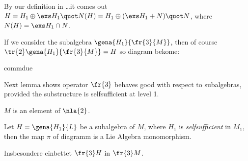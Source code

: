 By our definition in \dots it comes out
$H=H_1\oplus\exs H_1\quot N(H)=H_1\oplus(\exs H_1+N)\quot N$, where $N(H)=\exs H_1\cap N$.

If we consider the subalgebra $\gena{H_1}{\fr{3}{M}}$, then of course $\tr{2}\gena{H_1}{\fr{3}{M}}=H$ so diagram
 bekome:
\begin{labeq}{commdue}
\end{labeq}

Next lemma shows operator $\fr{3}$ behaves good with respect to subalgebras, provided the substructure
is selfsufficient at level 1.

\label{bellemma}
\begin{lem}
$M$ is an element of $\nla{2}$.

Let $H=\gena{H_{1}}{L}$ be a subalgebra of $M$, where $H_1$ is \emph{selfsufficient} in $M_1$,
then the map $\pi$ of diagramm {\rm{}} is a Lie Algebra monomorphism.

Insbesondere einbettet $\fr{3}H$ in $\fr{3}M$.
\end{lem}
